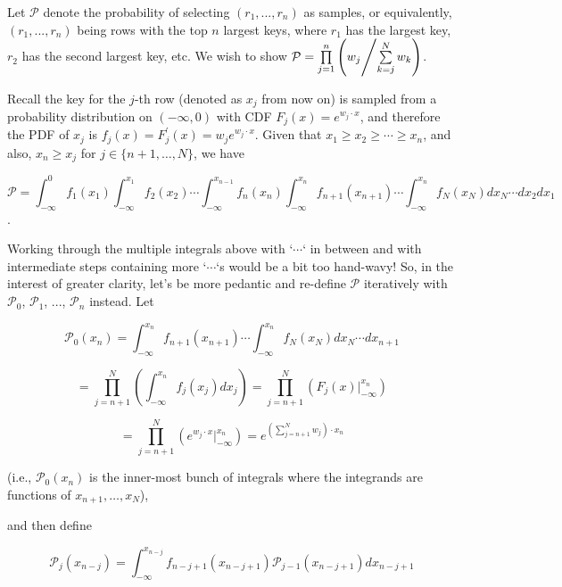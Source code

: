 \documentclass[fleqn]{article}
\begin{document}
Let $\mathcal{P}$ denote the probability of selecting $(r_1, ..., r_n)$ as samples, or equivalently, $(r_1, ..., r_n)$ being rows with the top $n$ largest keys, where $r_1$ has the largest key, $r_2$ has the second largest key, etc. We wish to show $\mathcal{P} = \prod\limits_{j = 1}^{n} \left( {w_j} \middle/ {\sum\limits_{k = j}^{N}{w_k}} \right)$.

\bigskip

Recall the key for the $j$-th row (denoted as $x_j$ from now on) is sampled from a probability distribution on $(-\infty, 0)$ with CDF $F_j(x) = e^{w_j \cdot x}$, and therefore the PDF of $x_j$ is $f_j(x) = F_j^\prime(x) = w_j e^{w_j \cdot x}$. Given that $x_1 \ge x_2 \ge \cdots \ge x_n$, and also, $x_n \ge x_j$ for $j \in \{ n + 1, \dots, N \}$, we have

$$
\mathcal{P} = \int_{-\infty}^{0}f_1(x_1)\int_{-\infty}^{x_1}f_2(x_2) \cdots \int_{-\infty}^{x_{n - 1}}f_n(x_n) \int_{-\infty}^{x_n} f_{n + 1}(x_{n + 1}) \cdots \int_{-\infty}^{x_n} f_{N}(x_{N}) d x_N \cdots d x_2 d x_1
$$.

Working through the multiple integrals above with `$\cdots$` in between and with intermediate steps containing more `$\cdots$`s would be a bit too hand-wavy! So, in the interest of greater clarity, let's be more pedantic and re-define $\mathcal{P}$ iteratively with $\mathcal{P}_0$, $\mathcal{P}_1$, ..., $\mathcal{P}_n$ instead. Let

\bigskip

$$
\mathcal{P}_0(x_n) = \int_{-\infty}^{x_n} f_{n + 1}(x_{n + 1}) \cdots \int_{-\infty}^{x_n} f_N(x_N) d x_N \cdots d x_{n + 1}
$$

$$
 = \prod\limits_{j = n + 1}^N\left(\int_{-\infty}^{x_n} f_j(x_j) d x_j\right)
 = \prod\limits_{j = n + 1}^N\left(F_j(x)\bigg\rvert_{-\infty}^{x_n}\right)
$$

$$
 = \prod\limits_{j = n + 1}^N\left(e^{w_j \cdot x} \bigg\rvert_{-\infty}^{x_n}\right)
 = e^{\left(\sum\limits_{j = n + 1}^N w_j\right) \cdot x_n}
$$

\bigskip

(i.e., $\mathcal{P}_0(x_n)$ is the inner-most bunch of integrals where the integrands are functions of $x_{n + 1}, \dots, x_N$),

\bigskip

and then define

$$
\mathcal{P}_j(x_{n - j}) = \int_{-\infty}^{x_{n-j}}f_{n - j + 1}(x_{n - j + 1}) \mathcal{P}_{j - 1}(x_{n - j + 1}) d x_{n - j + 1}
$$
\end{document}
